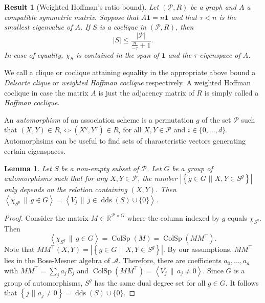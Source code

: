 \documentclass[a4paper]{article}
\newtheorem{lm}[thm]{Lemma}
\newtheorem{res}[thm]{Result}
\theoremstyle{definition}
\newcommand{\RR}{\mathbb R}
\newcommand{\vspan}[1]{\left \langle #1 \right \rangle}
\newcommand{\sett}[2]{ \left\{ #1 \, \, || \, \, #2 \right \} }
\newcommand{\one}{\mathbf 1}
\newcommand{\pp}{\mathcal P}
\newcommand{\ma}{\mathcal A}
\DeclareMathOperator{\ColSp}{ColSp}
\DeclareMathOperator{\dds}{dds}
\begin{document}
\begin{res}[Weighted Hoffman's ratio bound]
 \label{Res:Hoffman}
 Let $(\pp,R)$ be a graph and $A$ a compatible symmetric matrix.
 Suppose that $A \one = n \one$ and that $\tau < n$ is the smallest eigenvalue of $A$.
 If $S$ is a coclique in $(\pp,R)$, then
 \[
  |S| \leq \frac{|\pp|}{\frac{n}{-\tau}+1}.
 \]
 In case of equality, $\chi_S$ is contained in the span of $\one$ and the $\tau$-eigenspace of $A$.
\end{res}

We call a clique or coclique attaining equality in the appropriate above bound a \emph{Delsarte clique} or \emph{weighted Hoffman coclique} respectively.
A weighted Hoffman coclique in case the matrix $A$ is just the adjacency matrix of $R$ is simply called a \emph{Hoffman coclique}.

\bigskip

An \emph{automorphism} of an association scheme is a permutation $g$ of the set $\pp$ such that $(X,Y) \in R_i \iff (X^g,Y^g) \in R_i$ for all $X,Y \in \pp$ and $i \in \{0,\dots,d\}$.
Automorphsims can be useful to find sets of characteristic vectors generating certain eigenspaces.

\begin{lm}
 \label{Lm:SpanningOrbit}
 Let $S$ be a non-empty subset of $\pp$.
 Let $G$ be a group of automorphisms such that for any $X,Y \in \pp$, the number $|\sett{g \in G}{X,Y \in S^g}|$ only depends on the relation containing $(X,Y)$.
 Then $\vspan{\chi_{S^g} \, \| \, g \in G} = \vspan{V_j \, \| \, j \in \dds(S) \cup \{0\}}$.
\end{lm}

\begin{proof}
 Consider the matrix $M \in \RR^{\pp \times G}$ where the column indexed by $g$ equals $\chi_{S^g}$.
 Then
 \[
  \vspan{\chi_{S^g} \, \| \, g \in G} = \ColSp(M) = \ColSp(M M^\top).
 \]
 Note that $M M^\top(X,Y) = |\sett{g \in G}{X,Y \in S^g}|$.
 By our assumptions, $M M^\top$ lies in the Bose-Mesner algebra of $\ma$.
 Therefore, there are coefficients $a_0, \dots, a_d$ with $M M^\top = \sum_j a_j E_j$ and $\ColSp(M M^\top) = \vspan{V_j \, \| \, a_j \neq 0}$.
 Since $G$ is a group of automorphisms, $S^g$ has the same dual degree set for all $g \in G$.
 It follows that $\sett{j}{a_j \neq 0} = \dds(S) \cup \{0\}$.
\end{proof}
\end{document}
